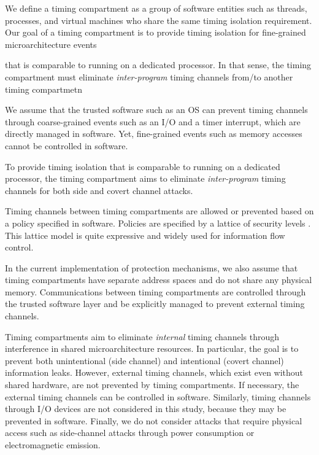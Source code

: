 We define a timing compartment as a group of 
software entities such as threads, processes, and virtual machines who share
the same timing isolation requirement. 
Our goal of a timing compartment is to provide timing isolation for fine-grained
microarchitecture events 

that is comparable
to running on a dedicated processor. In that sense, the timing compartment must
eliminate {\em inter-program} timing channels from/to another timing compartmetn 



We assume that the trusted software such as an OS can prevent timing channels 
through coarse-grained events such as an I/O and a timer interrupt, which are
directly managed in software. Yet, fine-grained events such as memory accesses 
cannot be controlled in software.

To provide timing isolation that is 
comparable to running on a dedicated processor, the timing compartment
aims to eliminate {\em inter-program} timing channels for both side and covert
channel attacks.

Timing 
channels between timing compartments are allowed or prevented based on a policy 
specified in software.  Policies are specified by a lattice of security levels
\cite{denning}.
This lattice model is quite expressive and widely used for information flow 
control. 



In the current implementation of protection mechanisms, we also assume that
timing compartments have separate address spaces and do not share any physical
memory. Communications between timing compartments are controlled through the 
trusted
software layer and be explicitly managed to prevent external timing channels. 


Timing compartments aim to eliminate {\em internal} timing channels through
interference in shared microarchitecture resources. In particular, the goal is
to prevent both unintentional (side channel) and intentional (covert channel)
information leaks.
However, external timing
channels, which exist even without shared hardware, are not prevented by
timing compartments. If necessary, the external timing channels can be 
controlled in software. Similarly, timing channels through I/O devices are not 
considered in this study,
because they may be prevented in software.
Finally, we do not consider attacks that require physical access such as
side-channel attacks through power consumption or electromagnetic emission.

